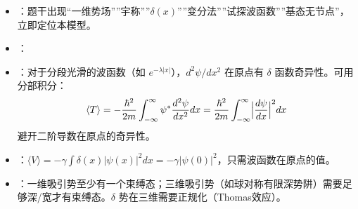\begin{tipbox}[快速识别与解题技巧]
\begin{itemize}
    \item {}：题干出现``一维势场''''宇称''''$\delta(x)$''''变分法''''试探波函数''''基态无节点''，立即定位本模型。
    \item {}：
    \begin{center}
    \end{center}
    \item {}：对于分段光滑的波函数（如 $e^{-\lambda|x|}$），$d^2\psi/dx^2$ 在原点有 $\delta$ 函数奇异性。可用分部积分：
    \[
    \langle T\rangle=-\frac{\hbar^2}{2m}\int_{-\infty}^{\infty}\psi^*\frac{d^2\psi}{dx^2}dx
    =\frac{\hbar^2}{2m}\int_{-\infty}^{\infty}\Bigl|\frac{d\psi}{dx}\Bigr|^2dx
    \]
    避开二阶导数在原点的奇异性。
    \item {}：$\langle V\rangle=-\gamma\int\delta(x)|\psi(x)|^2dx=-\gamma|\psi(0)|^2$，只需波函数在原点的值。
    \item {}：一维吸引势至少有一个束缚态；三维吸引势（如球对称有限深势阱）需要足够深/宽才有束缚态。$\delta$ 势在三维需要正规化（Thomas效应）。
\end{itemize}
\end{tipbox}

